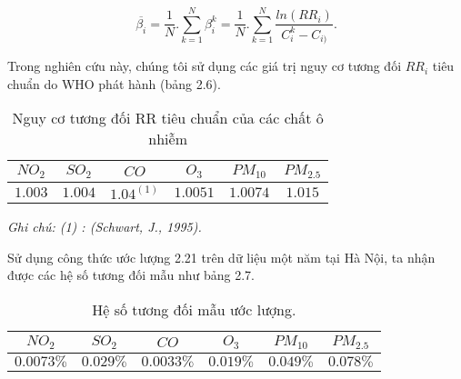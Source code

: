 \documentclass[14pt]{extreport}
\theoremstyle{definition}
\theoremstyle{plain}
\theoremstyle{remark}
\begin{document}
\begin{equation}
\overline{\beta_i} = \dfrac{1}{N}.\sum_{k=1}^N \beta_i^k = \dfrac{1}{N}.\sum_{k=1}^N \dfrac{ln(RR_i)}{C_i^k - C_{i)}}.
\end{equation}

Trong nghiên cứu này, chúng tôi sử dụng các giá trị nguy cơ tương đối $RR_i$ tiêu chuẩn do WHO phát hành (bảng 2.6).

\begin{table}
\begin{tabular}{|c|c|c|c|c|c|} 
 \hline
 \hspace{0.65cm}$NO_2$ \hspace{0.65cm} & \hspace{0.65cm}$SO_2$\hspace{0.65cm} & \hspace{0.7cm}$CO$\hspace{0.7cm} & \hspace{0.7cm}$O_3$\hspace{0.7cm} & \hspace{0.55cm}$PM_{10}$\hspace{0.55cm} & \hspace{0.55cm}$PM_{2.5}$\hspace*{0.55cm}\\
 \hline \hline
 $1.003$	&	$1.004$		&	$1.04^{(1)}$	&	$1.0051$		&	$1.0074$		&	$1.015$\\
 \hline
\end{tabular}
\caption{Nguy cơ tương đối RR tiêu chuẩn của các chất ô nhiễm \cite{WHO2001, Schwart1995}}
\textit{\small{Ghi chú: (1) :  (Schwart, J., 1995).}}
\end{table}

Sử dụng công thức ước lượng 2.21 trên dữ liệu một năm tại Hà Nội, ta nhận được các hệ số tương đối mẫu như bảng 2.7.

\begin{table}
\begin{tabular}{|c|c|c|c|c|c|} 
 \hline
 \hspace{0.65cm}$NO_2$ \hspace{0.65cm} & \hspace{0.65cm}$SO_2$\hspace{0.65cm} & \hspace{0.7cm}$CO$\hspace{0.7cm} & \hspace{0.7cm}$O_3$\hspace{0.7cm} & \hspace{0.55cm}$PM_{10}$\hspace{0.55cm} & \hspace{0.55cm}$PM_{2.5}$\hspace*{0.55cm}\\
 \hline \hline
 $0.0073\%$	&	$0.029\%$		&	$0.0033\%$	&	$0.019\%$		&	$0.049\%$		&	$0.078\%$ \\
\hline
\end{tabular}
\caption{Hệ số tương đối mẫu ước lượng.}
\end{table}
\end{document}
